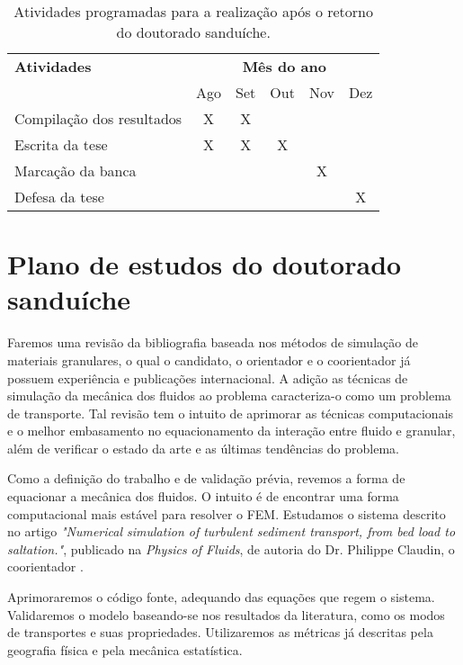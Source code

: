 \begin{table}[h]
    \begin{tabular}{| l|c|c|c|c|c |}
        \textbf{Atividades} & \multicolumn{5}{c}{\textbf{Mês do ano}}    \\
                                           & Ago & Set & Out & Nov & Dez \\
\hline        Compilação dos resultados    &  X  &  X  &     &     &     \\
\hline        Escrita da tese              &  X  &  X  &  X  &     &     \\
\hline        Marcação da banca            &     &     &     &  X  &     \\
\hline \hline Defesa da tese               &     &     &     &     &  X
    \end{tabular}
    \caption{Atividades programadas para a realização após o retorno do doutorado sanduíche.}
    \label{tab:CronogramaBRA}
\end{table}

\section{Plano de estudos do doutorado sanduíche}
\label{ch:Estudos}

Faremos uma revisão da bibliografia baseada nos métodos de simulação de materiais granulares, o qual o candidato, o orientador e o coorientador já possuem experiência e publicações internacional. A adição as técnicas de simulação da mecânica dos fluidos ao problema caracteriza-o como um problema de transporte. Tal revisão tem o intuito de aprimorar as técnicas computacionais e o melhor embasamento no equacionamento da interação entre fluido e granular, além de verificar o estado da arte e as últimas tendências do problema.

Como a definição do trabalho e de validação prévia, revemos a forma de equacionar a mecânica dos fluidos. O intuito é de encontrar uma forma computacional mais estável para resolver o FEM. Estudamos o sistema descrito no artigo \textit{"Numerical simulation of turbulent sediment transport, from bed load to saltation."}, publicado na \textit{Physics of Fluids}, de autoria do Dr. Philippe Claudin, o coorientador \cite{Numerical_simulation_of_turbulent_sediment_transport}.

Aprimoraremos o código fonte, adequando das equações que regem o sistema. Validaremos o modelo baseando-se nos resultados da literatura, como os modos de transportes e suas propriedades. Utilizaremos as métricas já descritas pela geografia física e pela mecânica estatística.


